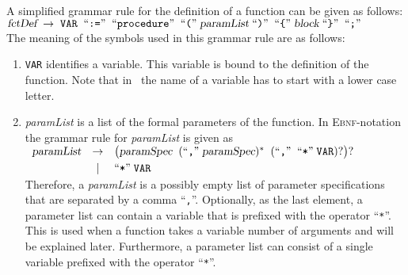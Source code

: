 \noindent
A simplified grammar rule for the definition of a function can be given as follows:
\\[0.2cm]
\hspace*{1.3cm}
$\textsl{fctDef} \;\rightarrow\; \mathtt{VAR}\; \;\mbox{``\texttt{:=}''}\; \;\mbox{``\texttt{procedure}''}\; \;\mbox{``\texttt{(}''}\; \textsl{paramList} 
 \;\mbox{``\texttt{)}''}\; \;\mbox{``\texttt{\{}''}\; \textsl{block} \;\mbox{``\texttt{\}}''}\; \;\mbox{``\texttt{;}''}\;$
\\[0.2cm]
The meaning of the symbols used in this grammar rule are as follows:
\begin{enumerate}
\item \texttt{VAR} identifies a variable.  This variable is bound to the definition of the function.
      Note that in \setlx\ the name of a variable has to start with a lower case letter.
\item \textsl{paramList} is a list of the formal parameters of the function.  In
      \textsc{Ebnf}-notation the grammar rule for \textsl{paramList} is given as
      \\[0.2cm]
      \hspace*{1.3cm}
      $
      \begin{array}[t]{lcl}
        \textsl{paramList} & \rightarrow & 
        \bigl(\textsl{paramSpec}\;\; (\mbox{``\texttt{,}''}\; \textsl{paramSpec})^* \;\; (\mbox{``\texttt{,}''} \;\; \mbox{``\texttt{*}''} \;\mathtt{VAR})?\bigr)? \\[0.1cm]
        & \mid & \mbox{``\texttt{*}''} \;\mathtt{VAR} \\
      \end{array}
      $
      \\[0.2cm]
      Therefore, a \textsl{paramList} is a possibly empty list of parameter specifications that are 
      separated by a comma ``\texttt{,}''.  Optionally, as the last element, a parameter list can
      contain a variable that is prefixed with the operator ``\texttt{*}''.  This is used when
      a function takes a variable number of arguments and will be explained later.  Furthermore,
      a parameter list can consist of a single variable prefixed with the operator ``\texttt{*}''.


\end{enumerate}
